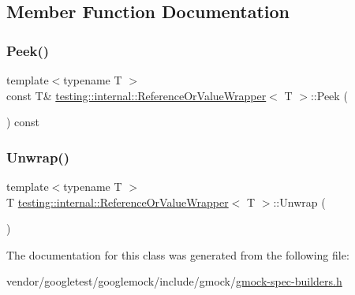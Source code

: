 \subsection{Member Function Documentation}
\mbox{\label{classtesting_1_1internal_1_1_reference_or_value_wrapper_a235cdb913959a71ad2a98fdd0965fe59}} 
\subsubsection{\texorpdfstring{Peek()}{Peek()}}
{\footnotesize\ttfamily template$<$typename T $>$ \\
const T\& \hyperlink{classtesting_1_1internal_1_1_reference_or_value_wrapper}{testing\+::internal\+::\+Reference\+Or\+Value\+Wrapper}$<$ T $>$\+::Peek (\begin{DoxyParamCaption}{ }\end{DoxyParamCaption}) const\hspace{0.3cm}{\ttfamily [inline]}}

\mbox{\label{classtesting_1_1internal_1_1_reference_or_value_wrapper_a5a6505b809ba770725e7b8091927a5ba}} 
\subsubsection{\texorpdfstring{Unwrap()}{Unwrap()}}
{\footnotesize\ttfamily template$<$typename T $>$ \\
T \hyperlink{classtesting_1_1internal_1_1_reference_or_value_wrapper}{testing\+::internal\+::\+Reference\+Or\+Value\+Wrapper}$<$ T $>$\+::Unwrap (\begin{DoxyParamCaption}{ }\end{DoxyParamCaption})\hspace{0.3cm}{\ttfamily [inline]}}



The documentation for this class was generated from the following file\+:\begin{DoxyCompactItemize}
\item 
vendor/googletest/googlemock/include/gmock/\hyperlink{gmock-spec-builders_8h}{gmock-\/spec-\/builders.\+h}\end{DoxyCompactItemize}
